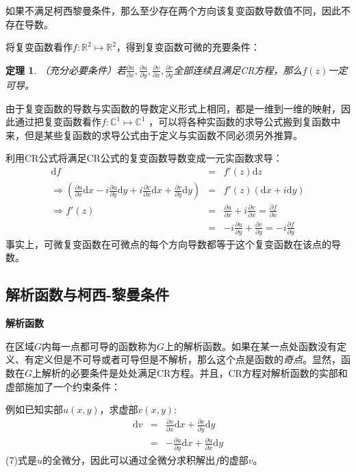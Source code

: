 \documentclass[UTF8]{ctexart}
\newcommand{\mathd}{\mathrm{d}}
\newcommand{\tmtextbf}[1]{{\bfseries{#1}}}
\newcommand{\tmtextit}[1]{{\itshape{#1}}}
\newtheorem{theorem}{定理}
\begin{document}
如果不满足柯西黎曼条件，那么至少存在两个方向该复变函数导数值不同，因此不存在导数。

将复变函数看作$f : \mathbb{R}^2 \mapsto
\mathbb{R}^2$，得到复变函数可微的充要条件：

\begin{theorem}
  （充分必要条件）若$\frac{\partial u}{\partial x}, \frac{\partial
  u}{\partial y}, \frac{\partial v}{\partial x}, \frac{\partial v}{\partial
  y}$全部连续且满足CR方程，那么$f (z)$一定可导。
\end{theorem}

由于复变函数的导数与实函数的导数定义形式上相同，都是一维到一维的映射，因此通过把复变函数看作$f: \mathbb{C}^1 \mapsto\mathbb{C}^1$
，可以将各种实函数的求导公式搬到复函数中来，但是某些复函数的求导公式由于定义与实函数不同必须另外推算。

利用CR公式将满足CR公式的复变函数导数变成一元实函数求导：
\begin{eqnarray}
  \mathd f & = & f' (z) \mathd z \nonumber\\
  \Rightarrow \left( \frac{\partial u}{\partial x} \mathd x - i \frac{\partial
  u}{\partial y} \mathd y + i \frac{\partial v}{\partial x} \mathd x +
  \frac{\partial v}{\partial y} \mathd y \right) & = & f' (z) (\mathd x + i
  \mathd y) \nonumber\\
  \Rightarrow f' (z) & = & \frac{\partial u}{\partial x} + i \frac{\partial
  v}{\partial x} = \frac{\partial f}{\partial x} \nonumber\\
  & = & - i \frac{\partial u}{\partial y} + \frac{\partial v}{\partial y} = -
  i \frac{\partial f}{\partial y}
\end{eqnarray}
事实上，可微复变函数在可微点的每个方向导数都等于这个复变函数在该点的导数。

\subsection{解析函数与柯西-黎曼条件}

\tmtextbf{解析函数}

在区域$G$内每一点都可导的函数称为$G$上的解析函数。如果在某一点处函数没有定义、有定义但是不可导或者可导但是不解析，那么这个点是函数的\tmtextit{奇点}。显然，函数在$G$上解析的必要条件是处处满足CR方程。并且，CR方程对解析函数的实部和虚部施加了一个约束条件：

例如已知实部$u (x, y)$，求虚部$v (x, y)$:
\begin{eqnarray}
  \mathd v & = & \frac{\partial v}{\partial x} \mathd x + \frac{\partial
  v}{\partial y} \mathd y \nonumber\\
  & = & - \frac{\partial u}{\partial y} \mathd x + \frac{\partial u}{\partial
  x} \mathd y
\end{eqnarray}
(7)式是$u$的全微分，因此可以通过全微分求积解出$f$的虚部$v$。
\end{document}
